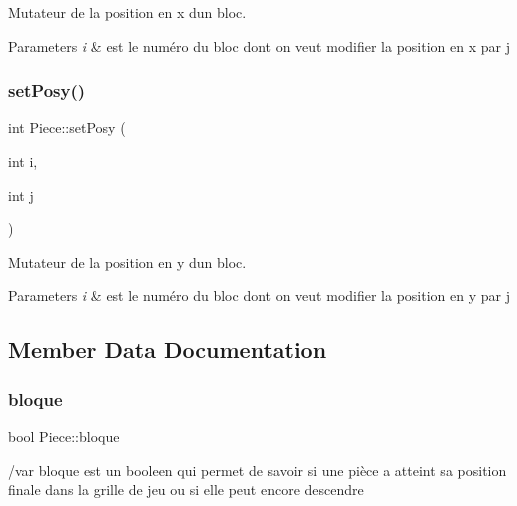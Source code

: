 Mutateur de la position en x d\textquotesingle{}un bloc. 


\begin{DoxyParams}{Parameters}
{\em i} & est le numéro du bloc dont on veut modifier la position en x par j \\
\hline
\end{DoxyParams}
\mbox{\label{classPiece_a53af32e68bb73e5ed23f3ac96a9d1516}} 
\subsubsection{\texorpdfstring{set\+Posy()}{setPosy()}}
{\footnotesize\ttfamily int Piece\+::set\+Posy (\begin{DoxyParamCaption}\item[{int}]{i,  }\item[{int}]{j }\end{DoxyParamCaption})}



Mutateur de la position en y d\textquotesingle{}un bloc. 


\begin{DoxyParams}{Parameters}
{\em i} & est le numéro du bloc dont on veut modifier la position en y par j \\
\hline
\end{DoxyParams}


\subsection{Member Data Documentation}
\mbox{\label{classPiece_a99b4e2bbf91e0e609fc5141135a2e0ad}} 
\subsubsection{\texorpdfstring{bloque}{bloque}}
{\footnotesize\ttfamily bool Piece\+::bloque\hspace{0.3cm}{\ttfamily [protected]}}

/var bloque est un booleen qui permet de savoir si une pièce a atteint sa position finale dans la grille de jeu ou si elle peut encore descendre \mbox{\label{classPiece_a4268f3b047e1ad284882708b85332ef1}} 

